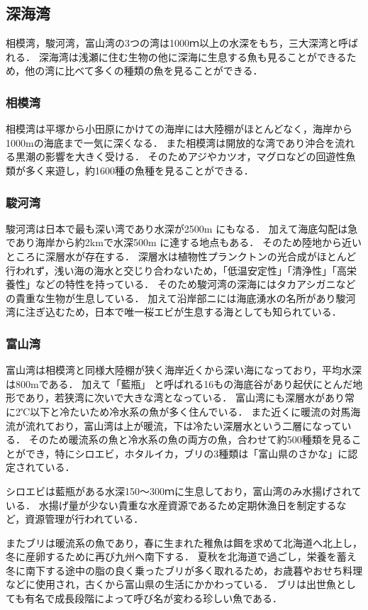 \documentclass[12pt,a4j,titlepage]{ltjsarticle}
\begin{document}
\subsection{深海湾}
相模湾，駿河湾，富山湾の3つの湾は1000ｍ以上の水深をもち，三大深湾と呼ばれる．
深海湾は浅瀬に住む生物の他に深海に生息する魚も見ることができるため，他の湾に比べて多くの種類の魚を見ることができる．
\subsubsection{相模湾}
相模湾は平塚から小田原にかけての海岸には大陸棚がほとんどなく，海岸から1000mの海底まで一気に深くなる．
また相模湾は開放的な湾であり沖合を流れる黒潮の影響を大きく受ける．
そのためアジやカツオ，マグロなどの回遊性魚類が多く来遊し，約1600種の魚種を見ることができる\cite{sagami}．
\subsubsection{駿河湾}
駿河湾は日本で最も深い湾であり水深が2500m にもなる\cite{suruga}．
加えて海底勾配は急であり海岸から約2kmで水深500m に達する地点もある．
そのため陸地から近いところに深層水が存在する．
深層水は植物性プランクトンの光合成がほとんど行われず，浅い海の海水と交じり合わないため，「低温安定性」「清浄性」「高栄養性」などの特性を持っている．
そのため駿河湾の深海にはタカアシガニなどの貴重な生物が生息している．
加えて沿岸部ニには海底湧水の名所があり駿河湾に注ぎ込むため，日本で唯一桜エビが生息する海としても知られている．
\subsubsection{富山湾}
富山湾は相模湾と同様大陸棚が狭く海岸近くから深い海になっており，平均水深は800mである\cite{toyama}．
加えて「藍瓶」 と呼ばれる16もの海底谷があり起伏にとんだ地形であり，若狭湾に次いで大きな湾となっている．
富山湾にも深層水があり常に2℃以下と冷たいため冷水系の魚が多く住んでいる．
また近くに暖流の対馬海流が流れており，富山湾は上が暖流，下は冷たい深層水という二層になっている．
そのため暖流系の魚と冷水系の魚の両方の魚，合わせて約500種類を見ることができ，特にシロエビ，ホタルイカ，ブリの3種類は「富山県のさかな」に認定されている．\par
シロエビは藍瓶がある水深150～300ｍに生息しており，富山湾のみ水揚げされている．
水揚げ量が少ない貴重な水産資源であるため定期休漁日を制定するなど，資源管理が行われている．\par
またブリは暖流系の魚であり，春に生まれた稚魚は餌を求めて北海道へ北上し，冬に産卵するために再び九州へ南下する．
夏秋を北海道で過ごし，栄養を蓄え冬に南下する途中の脂の良く乗ったブリが多く取れるため，お歳暮やおせち料理などに使用され，古くから富山県の生活にかかわっている．
ブリは出世魚としても有名で成長段階によって呼び名が変わる珍しい魚である．
\end{document}
